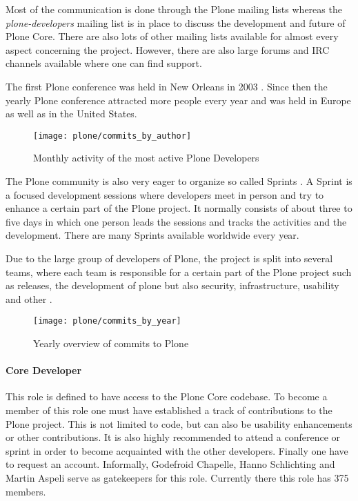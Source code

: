 Most of the communication is done through the Plone mailing lists whereas the
\emph{plone-developers} mailing list is in place to discuss the development and
future of Plone Core. There are also lots of other mailing lists available for
almost every aspect concerning the project. However, there are also large
forums and \ac{IRC} channels available where one can find support.

The first Plone conference was held in New Orleans in 2003
\cite{PloneConferences}. Since then the yearly Plone conference attracted more
people every year and was held in Europe as well as in the United States.

\begin{figure}[htbp]
  \centering
  \texttt{[image: plone/commits\_by\_author]}
  \caption{Monthly activity of the most active Plone Developers}
\end{figure}

The Plone community is also very eager to organize so called Sprints
\cite{PloneSprints}. A Sprint is a focused development sessions where
developers meet in person and try to enhance a certain part of the Plone
project. It normally consists of about three to five days in which one person
leads the sessions and tracks the activities and the development. There are
many Sprints available worldwide every year.

Due to the large group of developers of Plone, the project is split into
several teams, where each team is responsible for a certain part of the Plone
project such as releases, the development of plone but also security,
infrastructure, usability and other
\cite{PloneFounders,PloneReleaseManagers,PloneFrameworkTeam,PloneContribute}.

\begin{figure}[htbp]
  \centering
  \texttt{[image: plone/commits\_by\_year]}
  \caption{Yearly overview of commits to Plone}
\end{figure}

\paragraph{Core Developer}

This role is defined to have access to the Plone Core codebase. To become a
member of this role one must have established a track of contributions to the
Plone project. This is not limited to code, but can also be usability
enhancements or other contributions. It is also highly recommended to attend a
conference or sprint in order to become acquainted with the other developers.
Finally one have to request an account. Informally, Godefroid Chapelle, Hanno
Schlichting and Martin Aspeli serve as gatekeepers for this role. Currently
there this role has 375 members.

